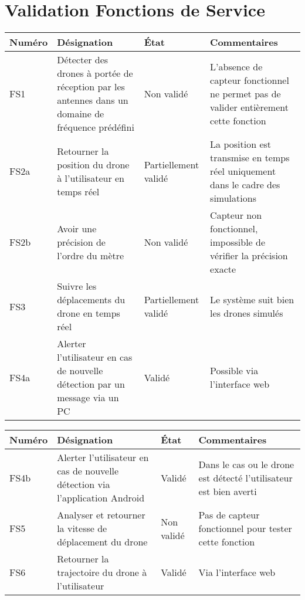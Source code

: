 \chapter{Validation Fonctions de Service}


\begin{tabular}{|p{}| |p{}  |m{}  |p{} |}	

     \hline
     Numéro & Désignation & État & Commentaires \\ \hline
     FS1 & Détecter des drones à portée de réception par les antennes dans un domaine de fréquence prédéfini & Non validé & L'absence de capteur fonctionnel ne permet pas de valider entièrement cette fonction \\ \hline
     FS2a & Retourner la position du drone à l'utilisateur en temps réel & Partiellement validé & La position est transmise en temps réel uniquement dans le cadre des simulations \\ \hline
     FS2b & Avoir une précision de l'ordre du mètre & Non validé & Capteur non fonctionnel, impossible de vérifier la précision exacte \\ \hline
     FS3 & Suivre les déplacements du drone en temps réel & Partiellement validé & Le système suit bien les drones simulés \\ \hline
     FS4a & Alerter l'utilisateur en cas de nouvelle détection par un message via un PC & Validé & Possible via l'interface web \\ \hline
     \hline
   \end{tabular}

\begin{tabular}{|p{}| |p{}  |m{}  |p{} |}	

	\hline
	Numéro & Désignation & État & Commentaires \\ \hline
   	FS4b & Alerter l'utilisateur en cas de nouvelle détection via l'application Android & Validé & Dans le cas ou le drone est détecté l'utilisateur est bien averti \\ \hline
   	FS5 & Analyser et retourner la vitesse de déplacement du drone & Non validé & Pas de capteur fonctionnel pour tester cette fonction \\ \hline
   	FS6 & Retourner la trajectoire du drone à l'utilisateur & Validé & Via l'interface web \\      
   	\hline
\end{tabular}
	
	


